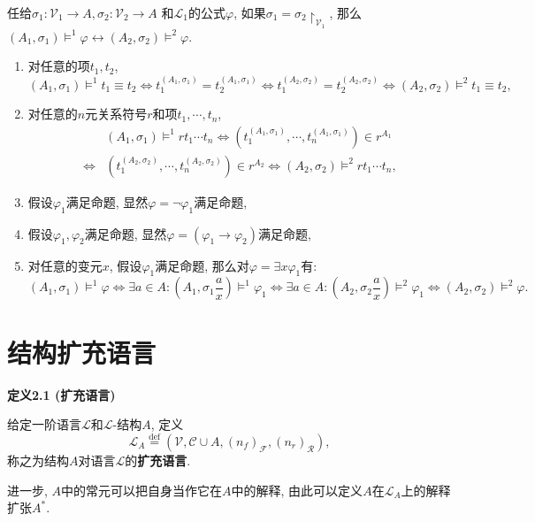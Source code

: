 \documentclass[UTF8]{ctexart}
\begin{document}
任给$\sigma_1:\mathcal{V}_1\to A,\sigma_2:\mathcal{V}_2\to A$
和$\mathcal{L}_1$的公式$\varphi$, 如果$\sigma_1=\sigma_2\!\restriction_{\mathcal{V}_1}$, 那么
$(A_1,\sigma_1)\models^1\varphi\leftrightarrow(A_2,\sigma_2)\models^2\varphi$.


\begin{enumerate}
    \item 对任意的项$t_1,t_2$,
    \[
        (A_1,\sigma_1)\models^1t_1\equiv t_2\iff
        t_1^{(A_1,\sigma_1)}=t_2^{(A_1,\sigma_1)}\iff
        t_1^{(A_2,\sigma_2)}=t_2^{(A_2,\sigma_2)}\iff
        (A_2,\sigma_2)\models^2t_1\equiv t_2,
    \]
    \item 对任意的$n$元关系符号$r$和项$t_1,\cdots,t_n$,
    \[\begin{aligned}
        &(A_1,\sigma_1)\models^1rt_1\cdots t_n\iff
        (t_1^{(A_1,\sigma_1)},\cdots,t_n^{(A_1,\sigma_1)})\in r^{A_1}\\[-3pt]
        \iff&(t_1^{(A_2,\sigma_2)},\cdots,t_n^{(A_2,\sigma_2)})\in r^{A_2}\iff
        (A_2,\sigma_2)\models^2rt_1\cdots t_n,
    \end{aligned}\]
    \item 假设$\varphi_1$满足命题, 显然$\varphi=\neg\varphi_1$满足命题,
    \item 假设$\varphi_1,\varphi_2$满足命题,
    显然$\varphi=(\varphi_1\to\varphi_2)$满足命题,
    \item 对任意的变元$x$, 假设$\varphi_1$满足命题,
    那么对$\varphi=\exists x\varphi_1$有:
    \begin{equation*}
        (A_1,\sigma_1)\models^1\varphi\iff
        \exists a\in A:\left(A_1,\sigma_1\frac{a}{x}\right)\models^1\varphi_1\iff
        \exists a\in A:\left(A_2,\sigma_2\frac{a}{x}\right)\models^2\varphi_1\iff
        (A_2,\sigma_2)\models^2\varphi.
    \tag*{\qedsymbol}\end{equation*}
\end{enumerate}

\vspace{20pt}





\section{结构扩充语言}

\hypertarget{sec:定义2.1}{}
\noindent\textbf{定义2.1 (扩充语言)}

给定一阶语言$\mathcal{L}$和$\mathcal{L}$-结构$A$, 定义
\[
    \mathcal{L}_A\overset{\mathrm{def}}{=}(\mathcal{V},\mathcal{C}\cup A,
    (n_f)_{\mathcal{F}},(n_r)_{\mathcal{R}}),
\]
称之为结构$A$对语言$\mathcal{L}$的\textbf{扩充语言}.


\vspace{10pt}

进一步, $A$中的常元可以把自身当作它在$A$中的解释,
由此可以定义$A$在$\mathcal{L}_A$上的解释扩张$A^*$.

\end{document}
